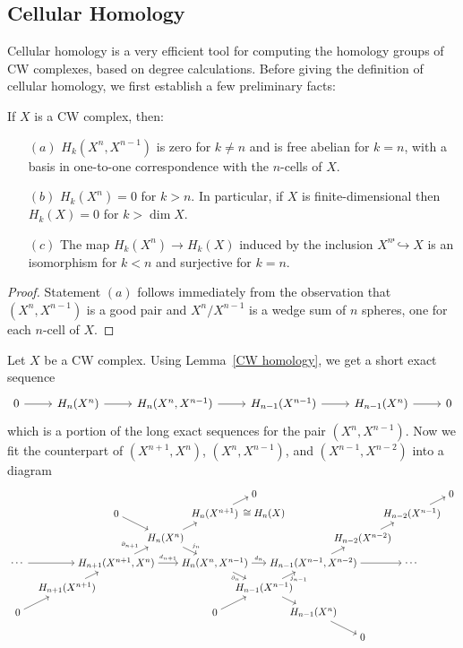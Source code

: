 \subsection{Cellular Homology}
Cellular homology is a very efficient tool for computing the homology groups of CW complexes, based on degree calculations. Before giving the definition of cellular homology, we first establish a few preliminary facts:
\begin{lemma}\label{CW homology}
If $X$ is a CW complex, then:
\begin{itemize}
\item[$(a)$]$H_k(X^n,X^{n-1})$ is zero for $k\neq n$ and is free abelian for $k=n$, with a basis in one-to-one correspondence with the $n$-cells of $X$.
\item[$(b)$]$H_k(X^n)=0$ for $k>n$. In particular, if $X$ is finite-dimensional then $H_k(X)=0$ for $k>\dim X$.
\item[$(c)$]The map $H_k(X^n)\to H_k(X)$ induced by the inclusion $X^n֓\hookrightarrow X$ is an isomorphism for $k<n$ and surjective for $k=n$.
\end{itemize}
\end{lemma}
\begin{proof}
Statement $(a)$ follows immediately from the observation that $(X^n,X^{n-1})$ is a good pair and $X^n/X^{n-1}$ is a wedge sum of $n$ spheres, one for each $n$-cell of $X$.
\end{proof}
Let $X$ be a CW complex. Using Lemma~\ref{CW homology}, we get a short exact sequence
\[\begin{tikzcd}
0\ar[r]&H_n(X^n)\ar[r]&H_n(X^n,X^{n-1})\ar[r]&H_{n-1}(X^{n-1})\ar[r]&H_{n-1}(X^n)\ar[r]&0
\end{tikzcd}\]
which is a portion of the long exact sequences for the pair $(X^n,X^{n-1})$. Now we fit the counterpart of $(X^{n+1},X^n)$, $(X^n,X^{n-1})$, and $(X^{n-1},X^{n-2})$ into a diagram
\[\begin{tikzpicture}[scale=0.85]
\node (0) at (0,0) {$\cdots$};
\node (k0) at (4,0) {$H_{n+1}(X^{n+1},X^n)$};
\node (k1) at (8,0) {$H_{n}(X^{n},X^{n-1})$};
\node (k2) at (12,0) {$H_{n-1}(X^{n-1},X^{n-2})$};
\node (k3) at (16,0) {$\cdots$};
\node (a1) at (6,1) {$H_n(X^n)$};
\node (a2) at (8,2) {$H_n(X^{n+1})$};
\node (s) at (10,2) {$\cong H_n(X)$};
\node (a3) at (9.6,2.8) {$0$};
\node (a4) at (4,2) {$0$};
\node (a5) at (14,1) {$H_{n-2}(X^{n-2})$};
\node (a6) at (16,2) {$H_{n-2}(X^{n-1})$};
\node (a7) at (17.6,2.8) {$0$};
\node (b1) at (10,-1) {$H_{n-1}(X^{n-1})$};
\node (b0) at (8,-2) {$0$};
\node (b2) at (2,-1) {$H_{n+1}(X^{n+1})$};
\node (b3) at (12,-2) {$H_{n-1}(X^n)$};
\node (b4) at (14,-3) {$0$};
\node (b5) at (0,-2) {$0$};
\draw[->]
(0) edge (k0)
(k0) edge node[node font=\tiny,auto] {$d_{n+1}$} (k1)
(k1) edge node[node font=\tiny,auto] {$d_{n}$} (k2)
(k2) edge (k3)
(k0) edge node[node font=\tiny,auto] {$\partial_{n+1}$} (a1) 
(a1) edge (a2)
(a2) edge (a3)
(a4) edge (a1)
(a1) edge node[node font=\tiny,auto] {$j_{n}$} (k1)
(k1) edge node[node font=\tiny,below,pos=0.2] {$\partial_{n}$} (b1) 
(b0) edge (b1)
(b1) edge node[node font=\tiny,below,pos=0.8,xshift=6pt] {$j_{n-1}$}(k2)
(b5) edge (b2)
(b2) edge (k0)
(b1) edge (b3)
(b3) edge (b4)
(k2) edge (a5)
(a5) edge (a6)
(a6) edge (a7);
\end{tikzpicture}\]

